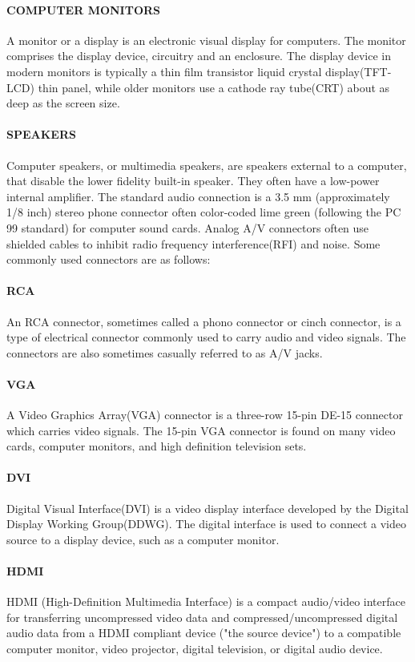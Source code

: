 \documentclass[a4paper,28pt,twoside,openright]{report}
\begin{document}
	\paragraph{COMPUTER MONITORS}
	 A monitor or a display is an electronic visual display for computers. The monitor
	comprises the display device, circuitry and an enclosure. The display device in modern monitors is
	typically a thin film transistor liquid crystal display(TFT-LCD) thin panel, while older monitors use
	a cathode ray tube(CRT) about as deep as the screen size.
	\paragraph{SPEAKERS}
	 Computer speakers, or multimedia speakers, are speakers external to a computer, that disable
	the lower fidelity built-in speaker. They often have a low-power internal amplifier. The standard audio
	connection is a 3.5 mm (approximately 1/8 inch) stereo phone connector often color-coded lime green
	(following the PC 99 standard) for computer sound cards. Analog A/V connectors often use shielded cables to
	inhibit radio frequency interference(RFI) and noise. Some commonly used connectors are as follows:
	 \paragraph{RCA}
	  An RCA connector, sometimes called a phono connector or cinch connector, is a type of electrical
	connector commonly used to carry audio and video signals. The connectors are also sometimes casually
	referred to as A/V jacks.
	\paragraph{VGA}
	 A Video Graphics Array(VGA) connector is a three-row 15-pin DE-15 connector which carries
	video signals. The 15-pin VGA connector is found on many video cards, computer monitors, and high
	definition television sets.
	\paragraph{DVI}
	 Digital Visual Interface(DVI) is a video display interface developed by the Digital Display Working
	Group(DDWG). The digital interface is used to connect a video source to a display device, such as
	a computer monitor.
	\paragraph{HDMI}
	 HDMI (High-Definition Multimedia Interface) is a compact audio/video interface for
	transferring uncompressed video data and compressed/uncompressed digital audio data from a HDMI compliant
	device ("the source device") to a compatible computer monitor, video projector, digital
	television, or digital audio device.
\end{document}
